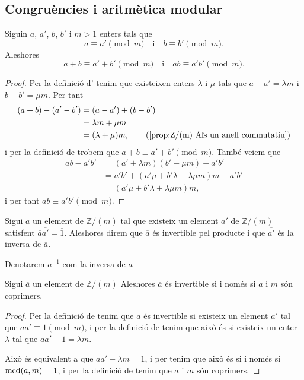 \documentclass[../Apunts.tex]{subfiles}
\begin{document}
	\subsection{Congruències i aritmètica modular}
	\begin{proposition}
		Siguin \(a\), \(a'\), \(b\), \(b'\) i \(m>1\) enters tals que
		\[a\equiv a'\pmod{m}\quad\text{i}\quad b\equiv b'\pmod{m}.\]
		Aleshores
		\[a+b\equiv a'+b'\pmod{m}\quad\text{i}\quad ab\equiv a'b'\pmod{m}.\]
		\begin{proof}
			Per la definició d' tenim que existeixen enters \(\lambda\) i \(\mu\) tals que \(a-a'=\lambda m\) i \(b-b'=\mu m\). Per tant
			\begin{align*}
			(a+b)-(a'-b')&=(a-a')+(b-b')\\
			&=\lambda m+\mu m\\
			&=(\lambda+\mu)m,\tag{\ref{prop:Z/(m) és un anell commutatiu}}
			\end{align*}
			i per la definició de  trobem que \(a+b\equiv a'+b'\pmod{m}\). També veiem que
			\begin{align*}
			ab-a'b'&=(a'+\lambda m)(b'-\mu m)-a'b'\\
			&=a'b'+(a'\mu+b'\lambda+\lambda\mu m)m-a'b'\\
			&=(a'\mu+b'\lambda+\lambda\mu m)m,
			\end{align*}
			i per tant \(ab\equiv a'b'\pmod{m}\).
		\end{proof}
	\end{proposition}
	\begin{definition}
		\label{def:nombre modular invertible}
		Sigui \(\overline{a}\) un element de \(\mathbb{Z}/(m)\) tal que existeix un element \(\overline{a'}\) de \(\mathbb{Z}/(m)\) satisfent \(\overline{a}\overline{a'}=\overline{1}\). Aleshores direm que \(\overline{a}\) és invertible pel producte i que \(\overline{a'}\) és la inversa de \(\overline{a}\).
		
		Denotarem \(\overline{a}^{-1}\) com la inversa de \(\overline{a}\)
	\end{definition}
	\begin{proposition}
		\label{prop:condició equivalent a invertible en Z/(m)}
		Sigui \(\overline{a}\) un element de \(\mathbb{Z}/(m)\) Aleshores \(\overline{a}\) és invertible si i només si \(a\) i \(m\) són coprimers.
		\begin{proof}
			Per la definició de  tenim que \(\overline{a}\) és invertible si existeix un element \(a'\) tal que \(aa'\equiv1\pmod{m}\), i per la definició de  tenim que això és si existeix un enter \(\lambda\) tal que \(aa'-1=\lambda m\).
			
			Això és equivalent a que \(aa'-\lambda m=1\), i per  tenim que això és si i només si \(\operatorname{mcd}(a,m)=1\), i per la definició de  tenim que \(a\) i \(m\) són coprimers.
		\end{proof}
	\end{proposition}
\end{document}
